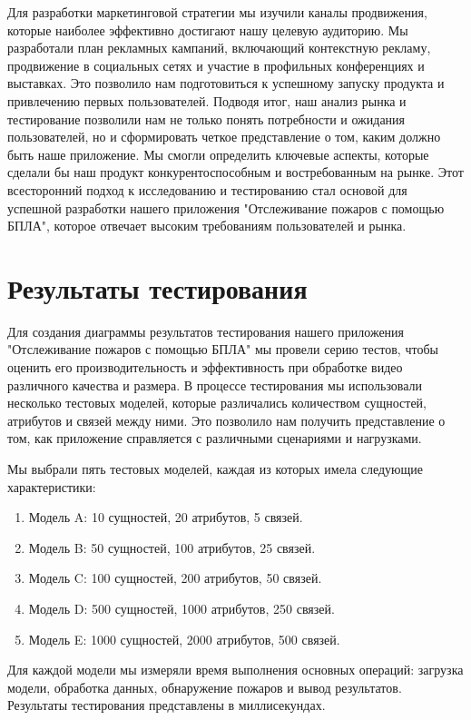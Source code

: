     Для разработки маркетинговой стратегии мы изучили каналы продвижения, которые наиболее эффективно достигают нашу целевую аудиторию. Мы разработали план рекламных кампаний, включающий контекстную рекламу, продвижение в социальных сетях и участие в профильных конференциях и выставках. Это позволило нам подготовиться к успешному запуску продукта и привлечению первых пользователей. Подводя итог, наш анализ рынка и тестирование позволили нам не только понять потребности и ожидания пользователей, но и сформировать четкое представление о том, каким должно быть наше приложение. Мы смогли определить ключевые аспекты, которые сделали бы наш продукт конкурентоспособным и востребованным на рынке. Этот всесторонний подход к исследованию и тестированию стал основой для успешной разработки нашего приложения "Отслеживание пожаров с помощью БПЛА", которое отвечает высоким требованиям пользователей и рынка.

    \section{Результаты тестирования}
    Для создания диаграммы результатов тестирования нашего приложения "Отслеживание пожаров с помощью БПЛА" мы провели серию тестов, чтобы оценить его производительность и эффективность при обработке видео различного качества и размера. В процессе тестирования мы использовали несколько тестовых моделей, которые различались количеством сущностей, атрибутов и связей между ними. Это позволило нам получить представление о том, как приложение справляется с различными сценариями и нагрузками.

    Мы выбрали пять тестовых моделей, каждая из которых имела следующие характеристики:
    \begin{enumerate}
        \item Модель A: 10 сущностей, 20 атрибутов, 5 связей. 
        \item Модель B: 50 сущностей, 100 атрибутов, 25 связей. 
        \item Модель C: 100 сущностей, 200 атрибутов, 50 связей. 
        \item Модель D: 500 сущностей, 1000 атрибутов, 250 связей. 
        \item Модель E: 1000 сущностей, 2000 атрибутов, 500 связей.
    \end{enumerate}
    
    Для каждой модели мы измеряли время выполнения основных операций: загрузка модели, обработка данных, обнаружение пожаров и вывод результатов. Результаты тестирования представлены в миллисекундах.

